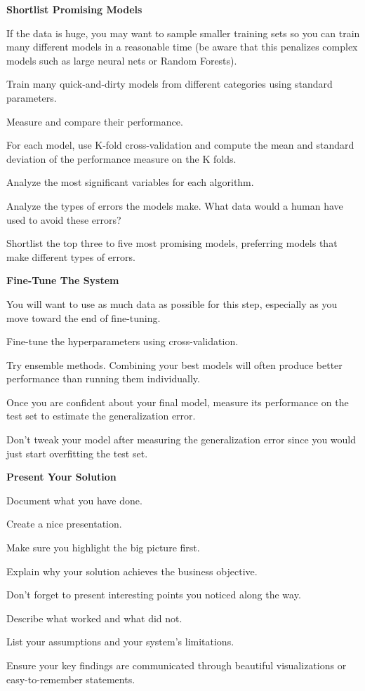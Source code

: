 \item \textbf{Shortlist Promising Models}
\bit
\item If the data is huge, you may want to sample smaller training sets so you can train many different models in a
reasonable time (be aware that this penalizes complex models such as large neural nets or Random Forests).
\item Train many quick-and-dirty models from different categories using standard parameters.
\item Measure and compare their performance.
\item For each model, use K-fold cross-validation and compute the mean and standard deviation of the performance
measure on the K folds.
\item Analyze the most significant variables for each algorithm.
\item Analyze the types of errors the models make. What data would a human have used to avoid these errors?
\item Shortlist the top three to five most promising models, preferring models that make different types of errors.
\eit

\item \textbf{Fine-Tune The System}
\bit
\item You will want to use as much data as possible for this step, especially as you move toward the end of fine-tuning.
\item Fine-tune the hyperparameters using cross-validation.
\item Try ensemble methods. Combining your best models will often produce better performance than running them
individually.
\item Once you are confident about your final model, measure its performance on the test set to estimate the
generalization error.
\item Don't tweak your model after measuring the generalization error since you would just start overfitting the test
set.
\eit

\item \textbf{Present Your Solution}
\bit
\item Document what you have done.
\item Create a nice presentation.
\item Make sure you highlight the big picture first.
\item Explain why your solution achieves the business objective.
\item Don't forget to present interesting points you noticed along the way.
\item Describe what worked and what did not.
\item List your assumptions and your system's limitations.
\item Ensure your key findings are communicated through beautiful visualizations or easy-to-remember statements.
\eit

